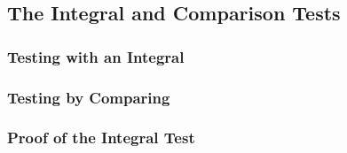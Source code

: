 \subsection{The Integral and Comparison Tests}

\subsubsection*{Testing with an Integral}

\subsubsection*{Testing by Comparing}

\subsubsection*{Proof of the Integral Test}
